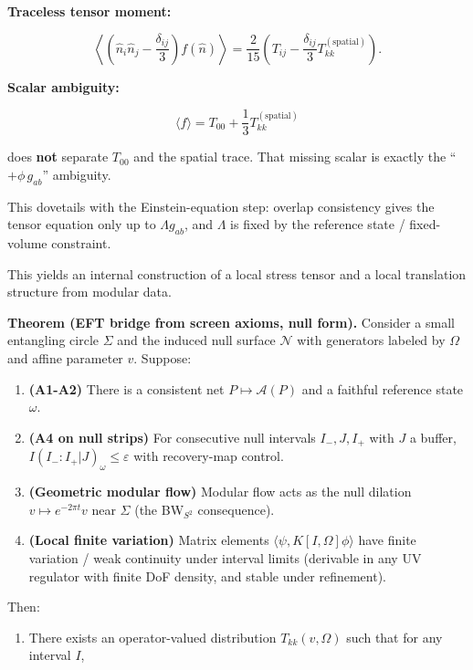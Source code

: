 \documentclass[
]{article}
\providecommand{\tightlist}{%
  \setlength{\itemsep}{0pt}\setlength{\parskip}{0pt}}
\begin{document}
\textbf{Traceless tensor moment:}

\[
\left\langle \left(\hat{n}_i \hat{n}_j - \frac{\delta_{ij}}{3}\right) f(\hat{n}) \right\rangle
= \frac{2}{15} \left(T_{ij} - \frac{\delta_{ij}}{3} T_{kk}^{\mathrm{(spatial)}}\right).
\]

\textbf{Scalar ambiguity:}

\[
\langle f \rangle = T_{00} + \frac{1}{3} T_{kk}^{\mathrm{(spatial)}}
\]

does \textbf{not} separate \(T_{00}\) and the spatial trace. That
missing scalar is exactly the ``\(+ \phi \, g_{ab}\)'' ambiguity.

This dovetails with the Einstein-equation step: overlap consistency
gives the tensor equation only up to \(\Lambda g_{ab}\), and \(\Lambda\)
is fixed by the reference state / fixed-volume constraint.

This yields an internal construction of a local stress tensor and a
local translation structure from modular data.

\textbf{Theorem (EFT bridge from screen axioms, null form).} Consider a
small entangling circle \(\Sigma\) and the induced null surface
\(\mathcal{N}\) with generators labeled by \(\Omega\) and affine
parameter \(v\). Suppose:

\begin{enumerate}
\def\labelenumi{\arabic{enumi}.}
\tightlist
\item
  \textbf{(A1-A2)} There is a consistent net
  \(P \mapsto \mathcal{A}(P)\) and a faithful reference state
  \(\omega\).
\item
  \textbf{(A4 on null strips)} For consecutive null intervals
  \(I_-, J, I_+\) with \(J\) a buffer,
  \(I(I_-:I_+|J)_\omega \le \varepsilon\) with recovery-map control.
\item
  \textbf{(Geometric modular flow)} Modular flow acts as the null
  dilation \(v \mapsto e^{-2\pi t} v\) near \(\Sigma\) (the BW\(_{S^2}\)
  consequence).
\item
  \textbf{(Local finite variation)} Matrix elements
  \(\langle \psi, K[I,\Omega] \phi \rangle\) have finite variation /
  weak continuity under interval limits (derivable in any UV regulator
  with finite DoF density, and stable under refinement).
\end{enumerate}

Then:

\begin{enumerate}
\def\labelenumi{(\alph{enumi})}
\tightlist
\item
  There exists an operator-valued distribution \(T_{kk}(v,\Omega)\) such
  that for any interval \(I\),
\end{enumerate}
\end{document}
